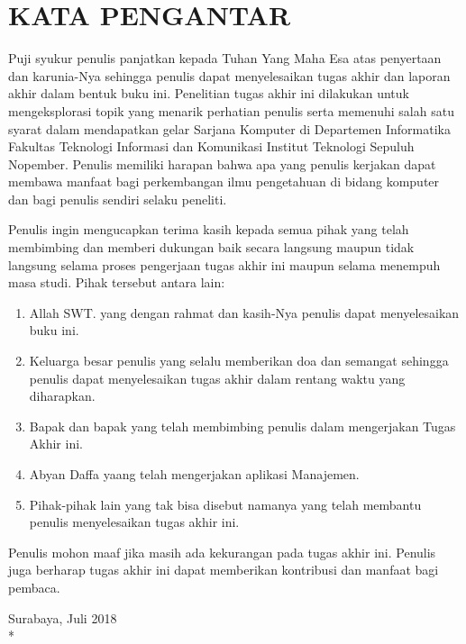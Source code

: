 \chapter {KATA PENGANTAR}

Puji syukur penulis panjatkan kepada Tuhan Yang Maha Esa atas penyertaan dan karunia-Nya sehingga penulis dapat menyelesaikan tugas akhir dan laporan akhir dalam bentuk buku ini. Penelitian tugas akhir ini dilakukan untuk mengeksplorasi topik yang menarik perhatian penulis serta memenuhi salah satu syarat dalam mendapatkan gelar Sarjana Komputer di Departemen Informatika Fakultas Teknologi Informasi dan Komunikasi Institut Teknologi Sepuluh Nopember. Penulis memiliki harapan bahwa apa yang penulis kerjakan dapat membawa manfaat bagi perkembangan ilmu pengetahuan di bidang komputer dan bagi penulis sendiri selaku peneliti.

Penulis ingin mengucapkan terima kasih kepada semua pihak yang telah membimbing dan memberi dukungan baik secara langsung maupun tidak langsung selama proses pengerjaan tugas akhir ini maupun selama menempuh masa studi. Pihak tersebut antara lain:

\begin {enumerate}
	\item Allah SWT. yang dengan rahmat dan kasih-Nya penulis dapat menyelesaikan buku ini.
    \item Keluarga besar penulis yang selalu memberikan doa dan semangat sehingga penulis dapat menyelesaikan tugas akhir dalam rentang waktu yang diharapkan. 
    \item Bapak \pembimbingsatu dan bapak \pembimbingdua yang telah membimbing penulis dalam mengerjakan Tugas Akhir ini.
    \item Abyan Daffa yaang telah mengerjakan aplikasi Manajemen.
    \item Pihak-pihak lain yang tak bisa disebut namanya yang telah membantu penulis menyelesaikan tugas akhir ini.
\end {enumerate}

Penulis mohon maaf jika masih ada kekurangan pada tugas akhir ini. Penulis juga berharap tugas akhir ini dapat memberikan kontribusi dan manfaat bagi pembaca.

\begin{flushright}
Surabaya, Juli 2018 \\*
\vspace{5em}
\penulis
\end{flushright}